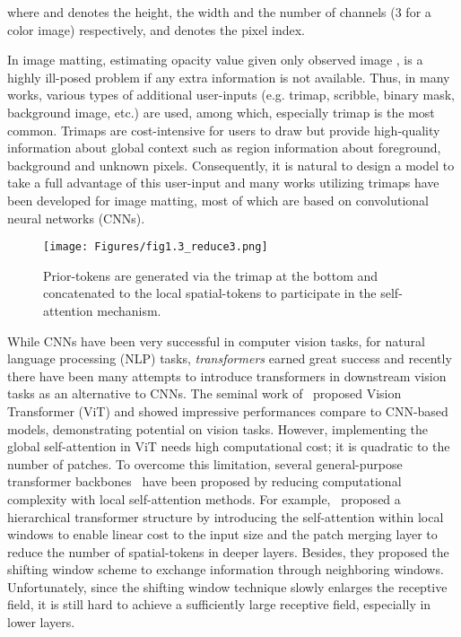 \documentclass[10pt,twocolumn,letterpaper]{article}
\begin{document}
where  and  denotes the height, the width and the number of channels (3 for a color image) respectively, and  denotes the pixel index. 

In image matting, estimating opacity value  given only observed image , is a highly ill-posed problem if any extra information is not available. Thus, in many works, various types of additional user-inputs (e.g. trimap, scribble, binary mask, background image, etc.) are used, among which, especially trimap is the most common. Trimaps are cost-intensive for users to draw but provide high-quality information about global context such as region information about foreground, background and unknown pixels. Consequently, it is natural to design a model to take a full advantage of this user-input and many works utilizing trimaps have been developed for image matting, most of which are based on convolutional neural networks (CNNs).

\begin{figure}
  \begin{center}
  \texttt{[image: Figures/fig1.3\_reduce3.png]}
  \end{center}
  \vspace{-5mm}
  \caption{Prior-tokens are generated via the trimap at the bottom and concatenated to the local spatial-tokens to participate in the self-attention mechanism.}
  \label{fig:intro}
\end{figure} 

While CNNs have been very successful in computer vision tasks, for natural language processing (NLP) tasks, \textit{transformers} earned great success and recently there have been many attempts to introduce transformers in downstream vision tasks as an alternative to CNNs. The seminal work of~\cite{dosovitskiy2020image} proposed Vision Transformer (ViT) and showed impressive performances compare to CNN-based models, demonstrating potential on vision tasks.
However, implementing the global self-attention in ViT needs high computational cost; it is quadratic to the number of patches. To overcome this limitation, several general-purpose transformer backbones~\cite{liu2021swin, dong2021cswin, yang2021focal} have been proposed by reducing computational complexity with local self-attention methods.
For example,~\cite{liu2021swin} proposed a hierarchical transformer structure by introducing the self-attention within local windows to enable linear cost to the input size and the patch merging layer to reduce the number of spatial-tokens in deeper layers. Besides, they proposed the shifting window scheme to exchange information through neighboring windows.
Unfortunately, since the shifting window technique slowly enlarges the receptive field, it is still hard to achieve a sufficiently large receptive field, especially in lower layers.
\end{document}

